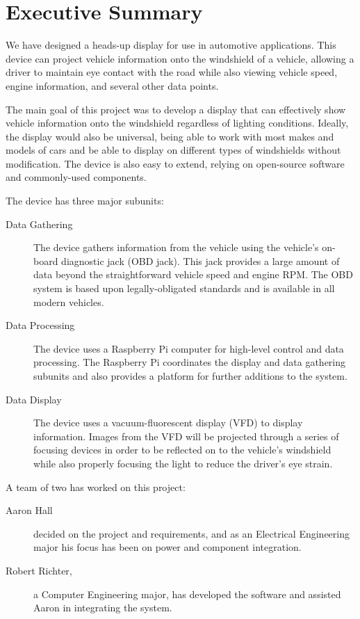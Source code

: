 \section{Executive Summary}

We have designed a heads-up display for use in automotive applications.
This device can project vehicle information onto the
windshield of a vehicle, allowing a driver to maintain eye contact
with the road while also viewing vehicle speed, engine information, and
several other data points.

The main goal of this project was to develop a display that can
effectively show vehicle information onto the windshield regardless of
lighting conditions. Ideally, the display would also be universal, being able
to work with most makes and models of cars and be able to display on
different types of windshields without modification. The device is also
easy to extend, relying on open-source software and commonly-used components.

The device has three major subunits:

\begin{description}
\item[Data Gathering] The device gathers information from the
vehicle using the vehicle's on-board diagnostic jack (OBD jack). This jack
provides a large amount of data beyond the straightforward vehicle speed and
engine RPM. The OBD system is based upon legally-obligated standards and is
available in all modern vehicles.
\item[Data Processing] The device uses a Raspberry Pi computer for high-level
control and data processing. The Raspberry Pi coordinates the display and
data gathering subunits and also provides a platform for further additions to
the system. 
\item[Data Display] The device uses a vacuum-fluorescent display (VFD) to
display information. Images from the VFD will be projected through a series of
focusing devices in order to be reflected on to the vehicle's windshield while
also properly focusing the light to reduce the driver's eye strain.
\end{description}

A team of two has worked on this project:

\begin{description}
\item[Aaron Hall] decided on the project and requirements, and as an Electrical
Engineering major his focus has been on power and component integration.
\item[Robert Richter,] a Computer Engineering
major, has developed the software and assisted Aaron in integrating the system.
\end{description}